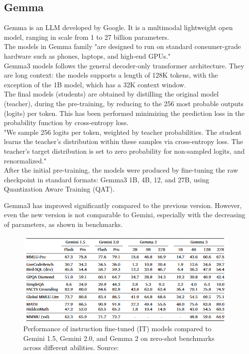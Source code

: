\documentclass[12pt]{article}
\begin{document}
    \subsection{Gemma}
Gemma is an LLM developed by Google. It is a multimodal lightweight open model, ranging in scale from 1 to 27 billion parameters.\\
The models in Gemma family "are designed to run on standard
consumer-grade hardware such as phones, laptops, and high-end GPUs."\cite{gemmateam2025gemma3technicalreport}\\
Gemma3 models follows the general decoder-only transformer architecture.\cite{vaswani2023attentionneed} They are long context: the models supports a length of 128K tokens, with the exception of the 1B model, which has a 32K context window.\\
The final models (students) are obtained by distilling the original model (teacher), during the pre-training, by reducing to the 256 most probable outputs (logits) per token. This has been performed minimizing the prediction loss in the probability function by cross-entropy loss.\\
"We sample 256 logits per token, weighted by teacher probabilities. The student learns the teacher’s distribution within these samples via cross-entropy loss. The teacher’s target distribution is set to zero probability for non-sampled logits, and renormalized."\cite{gemmateam2025gemma3technicalreport}\\
After the initial pre-training, the models were produced by fine-tuning the raw checkpoint in standard formats: Gemma3 1B, 4B, 12, and 27B, using Quantization Aware Training (QAT).

Gemma3 has improved significantly compared to the previous version. However, even the new version is not comparable to Gemini, especially with the decreasing of parameters, as shown in benchmarks.\\

    \begin{figure}[H]
    \centering
            \includegraphics[width=1\textwidth]{Gemma3Benchmarks.png}
    \caption[Gemma3 benchmarks]{Performance of instruction fine-tuned (IT) models compared to Gemini 1.5, Gemini 2.0, and Gemma 2 on zero-shot benchmarks across different abilities. Source: \cite{gemmateam2025gemma3technicalreport}}
    \end{figure}    
\end{document}
